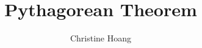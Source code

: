 \documentclass{article}
\title{Pythagorean Theorem}
\author{Christine Hoang}
\begin{document}
\maketitle

\section{}
\end{document}
